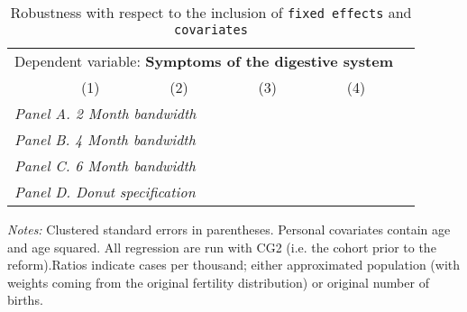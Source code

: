  \begin{table}[H] \begin{threeparttable} \centering \caption{Robustness with respect to the inclusion of \texttt{fixed effects} and \texttt{covariates}} {\def\sym#1{\ifmmode^{#1}\else\(^{#1}\)\fi} \begin{tabular}{l*{5}{c}} \toprule \multicolumn{5}{c}{Dependent variable: \textbf{Symptoms of the digestive system}} \\ \cmidrule(lr){2-5}
            &\multicolumn{1}{c}{(1)}&\multicolumn{1}{c}{(2)}&\multicolumn{1}{c}{(3)}&\multicolumn{1}{c}{(4)}\\
\midrule
 \multicolumn{5}{l}{\emph{Panel A. 2 Month bandwidth}} \\    \midrule\multicolumn{5}{l}{\emph{Panel B. 4 Month bandwidth}} \\    \midrule\multicolumn{5}{l}{\emph{Panel C. 6 Month bandwidth}} \\    \midrule\multicolumn{5}{l}{\emph{Panel D. Donut specification}} \\    \midrule  
\bottomrule \end{tabular} } \begin{tablenotes} \item \scriptsize \emph{Notes:} Clustered standard errors in parentheses. Personal covariates contain age and age squared. All regression are run with CG2 (i.e. the cohort prior to the reform).Ratios indicate cases per thousand; either approximated population (with weights coming from the original fertility distribution) or original number of births. \end{tablenotes} \end{threeparttable} \end{table} 
